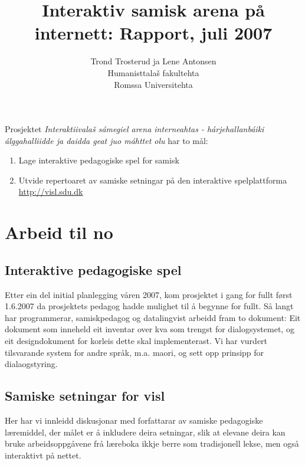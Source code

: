 \documentclass[a4paper,norsk]{article}
\begin{document}
\title{Interaktiv samisk arena på internett: Rapport, juli 2007}


\author{Trond Trosterud ja Lene Antonsen\\
Humanisttalaš fakultehta\\
Romssa Universitehta}

\maketitle


Prosjektet \textit{Interaktiivalaš sámegiel arena interneahtas - hárjehallanbáiki álggahalliidde ja daidda geat juo máhttet olu} har to mål:

\begin{enumerate}
\item Lage interaktive pedagogiske spel for samisk
\item Utvide repertoaret av samiske setningar på den interaktive spelplattforma \url{http://visl.sdu.dk}
\end{enumerate}

\section{Arbeid til no}

\subsection{Interaktive pedagogiske spel}

Etter ein del initial planlegging våren 2007, kom prosjektet i gang for fullt først 1.6.2007 da prosjektets pedagog hadde mulighet til å begynne for fullt. Så langt har programmerar, samiskpedagog og datalingvist arbeidd fram to dokument: Eit dokument som inneheld eit inventar over kva som trengst for dialogsystemet, og eit designdokument for korleis dette skal implementerast.   Vi har vurdert tilsvarande system for andre språk, m.a. maori, og sett opp prinsipp for dialaogstyring.

\subsection{Samiske setningar for visl}

Her har vi innleidd diskusjonar med forfattarar av samiske pedagogiske læremiddel, der målet er å inkludere deira setningar, slik at elevane deira kan bruke arbeidsoppgåvene frå læreboka ikkje berre som tradisjonell lekse, men også interaktivt på nettet.
\end{document}
